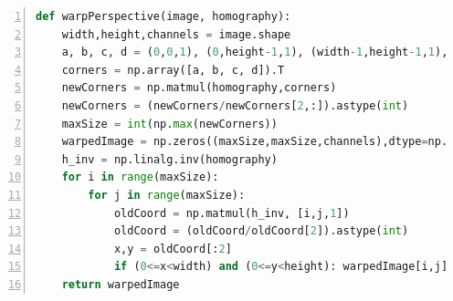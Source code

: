 \documentclass[11pt, a4paper]{article}
\begin{document}
\begin{lstlisting}[numbers=left,frame=single,language=python,caption=warpPerspective test function]
def warpPerspective(image, homography):
    width,height,channels = image.shape
    a, b, c, d = (0,0,1), (0,height-1,1), (width-1,height-1,1), (width-1,0,1)
    corners = np.array([a, b, c, d]).T
    newCorners = np.matmul(homography,corners)
    newCorners = (newCorners/newCorners[2,:]).astype(int)
    maxSize = int(np.max(newCorners))
    warpedImage = np.zeros((maxSize,maxSize,channels),dtype=np.uint8)
    h_inv = np.linalg.inv(homography)
    for i in range(maxSize):
        for j in range(maxSize):
            oldCoord = np.matmul(h_inv, [i,j,1])
            oldCoord = (oldCoord/oldCoord[2]).astype(int)
            x,y = oldCoord[:2]
            if (0<=x<width) and (0<=y<height): warpedImage[i,j] = image[x,y]
    return warpedImage
\end{lstlisting}
\end{document}

